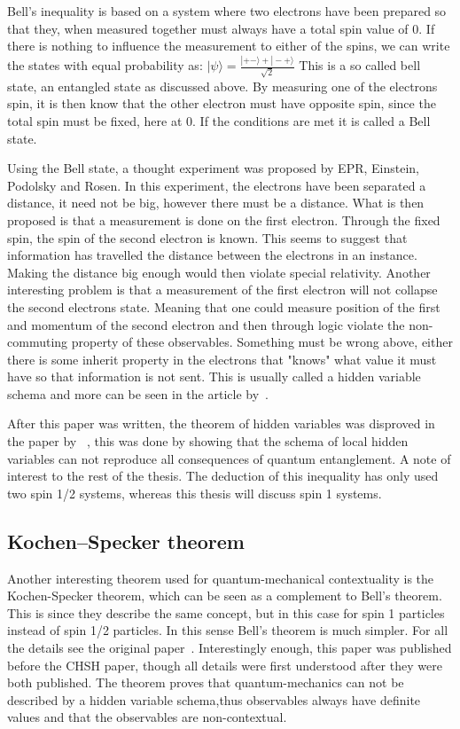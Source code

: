 Bell's inequality is based on a system where two electrons have been prepared so that they, when measured together must always have a total spin value of 0.
If there is nothing to influence the measurement to either of the spins, we can write the states with equal probability as: $|\psi\rangle = \frac{|+-\rangle + |-+\rangle}{\sqrt{2}}$
This is a so called bell state, an entangled state as discussed above.
By measuring one of the electrons spin, it is then know that the other electron must have opposite spin, since the total spin must be fixed, here at 0. If the conditions are met it is called a Bell state.

Using the Bell state, a thought experiment was proposed by EPR, Einstein, Podolsky and Rosen. In this experiment, the electrons have been separated a distance, it need not be big, however there must be a distance. What is then proposed is that a measurement is done on the first electron. Through the fixed spin, the spin of the second electron is known. This seems to suggest that information has travelled the distance between the electrons in an instance. Making the distance big enough would then violate special relativity. Another interesting problem is that a measurement of the first electron will not collapse the second electrons state. Meaning that one could measure position of the first and momentum of the second electron and then through logic violate the non-commuting property of these observables.
Something must be wrong above, either there is some inherit property in the electrons that "knows" what value it must have so that information is not sent. This is usually called a hidden variable schema and more can be seen in the article by~\cite{PhysRev.47.777}.

After this paper was written, the theorem of hidden variables was disproved in the paper by ~\cite{Bell:1964}, this was done by showing that the schema of local hidden variables can not reproduce all consequences of quantum entanglement. A note of interest to the rest of the thesis. The deduction of this inequality has only used two spin 1/2 systems, whereas this thesis will discuss spin 1 systems.
\subsection{Kochen–Specker theorem}
Another interesting theorem used for quantum-mechanical contextuality is the Kochen-Specker theorem, which can be seen as a complement to Bell's theorem. This is since they describe the same concept, but in this case for spin 1 particles instead of spin 1/2 particles. In this sense Bell's theorem is much simpler. For all the details see the original paper~\cite{Kochen1968The}. Interestingly enough, this paper was published before the CHSH paper, though all details were first understood after they were both published.
The theorem proves that quantum-mechanics can not be described by a hidden variable schema,thus observables always have definite values and that the observables are non-contextual.

